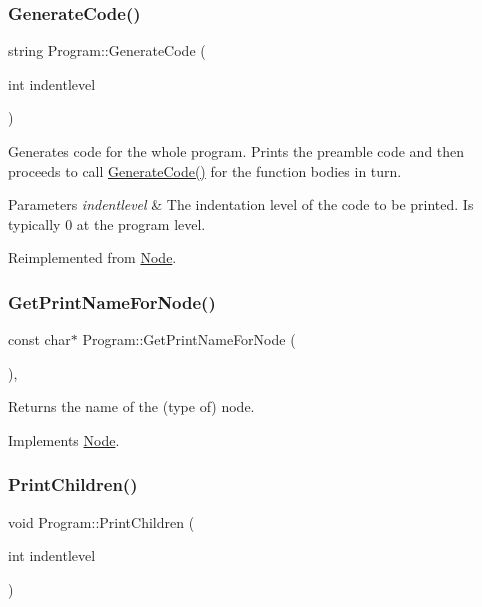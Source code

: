 \subsubsection{\texorpdfstring{Generate\+Code()}{GenerateCode()}}
{\footnotesize\ttfamily string Program\+::\+Generate\+Code (\begin{DoxyParamCaption}\item[{int}]{indentlevel }\end{DoxyParamCaption})\hspace{0.3cm}{\ttfamily [virtual]}}

Generates code for the whole program. Prints the preamble code and then proceeds to call \hyperlink{class_program_a4e709dc5cee7a2c28fe3d96694449c59}{Generate\+Code()} for the function bodies in turn. 
\begin{DoxyParams}{Parameters}
{\em indentlevel} & The indentation level of the code to be printed. Is typically 0 at the program level. \\
\hline
\end{DoxyParams}


Reimplemented from \hyperlink{class_node_acb60e526730e8436056375a3055c2c32}{Node}.

\mbox{\label{class_program_a42317e4371887f452b38b7a729a7533c}} 
\subsubsection{\texorpdfstring{Get\+Print\+Name\+For\+Node()}{GetPrintNameForNode()}}
{\footnotesize\ttfamily const char$\ast$ Program\+::\+Get\+Print\+Name\+For\+Node (\begin{DoxyParamCaption}{ }\end{DoxyParamCaption})\hspace{0.3cm}{\ttfamily [inline]}, {\ttfamily [virtual]}}

Returns the name of the (type of) node. 

Implements \hyperlink{class_node_a56e29657306ffb004d69c6929ae44269}{Node}.

\mbox{\label{class_program_a70520a269a65d735e10c6f28acf075ad}} 
\subsubsection{\texorpdfstring{Print\+Children()}{PrintChildren()}}
{\footnotesize\ttfamily void Program\+::\+Print\+Children (\begin{DoxyParamCaption}\item[{int}]{indentlevel }\end{DoxyParamCaption})\hspace{0.3cm}{\ttfamily [virtual]}}

